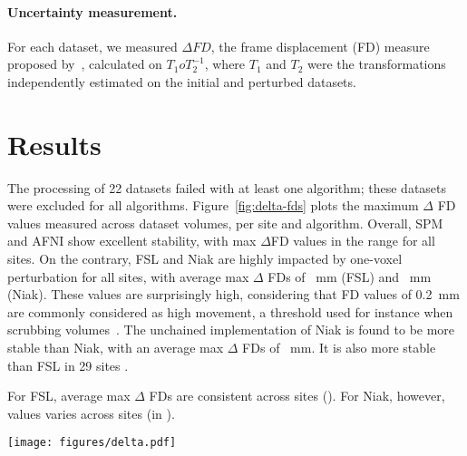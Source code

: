 \documentclass[11pt]{IEEEtran}
\begin{document}
\paragraph{Uncertainty measurement.}
For each dataset, we measured $\Delta FD$, the frame displacement (FD) 
measure proposed by~\cite{power2012spurious}, calculated on 
$T_1oT_2^{-1}$, where $T_1$ and $T_2$ were the transformations 
independently estimated on the initial and perturbed datasets. 


\section{Results}

The processing of 22 datasets failed with at least one algorithm; these
datasets were excluded for all algorithms. Figure~\ref{fig:delta-fds}
plots the maximum $\Delta$ FD values measured across dataset volumes, per
site and algorithm. Overall, SPM and AFNI show excellent stability, with
max $\Delta$FD values in the  range for all sites. On the contrary,
FSL and Niak are highly impacted by one-voxel perturbation for all sites, with average
max $\Delta$ FDs of ~mm (FSL) and ~mm (Niak). These values
are surprisingly high, considering that FD values of 0.2~mm are commonly
considered as high movement, a threshold used for instance when scrubbing
volumes~\cite{scrubbing}. The unchained implementation of Niak is found to
be more stable than Niak, with an average max $\Delta$ FDs of ~mm.
It is also more stable than FSL in 29 sites .

For FSL, average max $\Delta$ FDs are consistent across sites (\todo{[x, y]}). For Niak, however, values varies across sites
(in \todo{[x, y]}). 




\begin{figure*}
    \begin{center}
    \texttt{[image: figures/delta.pdf]}
    \caption{Max $\Delta$FD values measuring the effect of one-voxel perturbation per dataset, site and algorithm.
    For site DC\_1, results are shown for only 1 dataset as processing for the other 19 failed for at least 1 algorithm.}
    \end{center}
    \label{fig:delta-fds}
\end{figure*}

\end{document}

